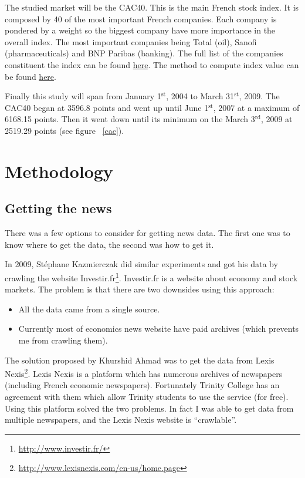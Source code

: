 \documentclass[12pt]{report}
\newcommand{\superscript}[1]{\ensuremath{^{\textrm{#1}}}}
\newcommand{\st}[0]{\superscript{st}}
\newcommand{\rd}[0]{\superscript{rd}}
\begin{document}
The studied market will be the CAC40. This is the main French stock index. It is composed by 40 of the most important French companies. Each company is pondered by a weight so the biggest company have more importance in the overall index. The most important companies being Total (oil), Sanofi (pharmaceuticals) and BNP Paribas (banking). The full list of the companies constituent the index can be found \href{http://en.wikipedia.org/wiki/CAC40}{here}. The method to compute index value can be found \href{http://www.euronext.com/fic/000/050/871/508718.pdf}{here}.

Finally this study will span from January 1\st, 2004 to March 31\st, 2009. The CAC40 began at 3596.8 points and went up until June 1\st, 2007 at a maximum of 6168.15 points. Then it went down until its minimum on the March 3\rd, 2009 at 2519.29 points (see figure ~\ref{cac}).

\chapter{Methodology}
\section{Getting the news}

There was a few options to consider for getting news data. The first one was to know where to get the data, the second was how to get it.

In 2009, Stéphane Kazmierczak \cite{kazmierczak08} did similar experiments and got his data by crawling the website Investir.fr\footnote{\url{http://www.investir.fr/}}. Investir.fr is a website about economy and stock markets. The problem is that there are two downsides using this approach:
\begin{itemize}
	\item All the data came from a single source.
	\item Currently most of economics news website have paid archives (which prevents me from crawling them).
\end{itemize}

The solution proposed by Khurshid Ahmad was to get the data from Lexis Nexis\footnote{\url{http://www.lexisnexis.com/en-us/home.page}}. Lexis Nexis is a platform which has numerous archives of newspapers (including French economic newspapers). Fortunately Trinity College has an agreement with them which allow Trinity students to use the service (for free). Using this platform solved the two problems. In fact I was able to get data from multiple newspapers, and the Lexis Nexis website is ``crawlable''.
\end{document}

